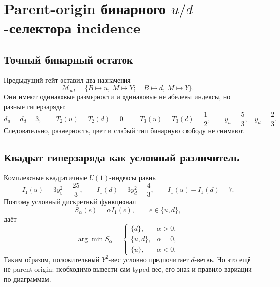\chapter{Parent-origin бинарного \texorpdfstring{$u/d$}{u/d}-селектора incidence}
\label{ch:v8-extra-mass-up-down-binary-selector-origin}

\section{Точный бинарный остаток}

Предыдущий гейт оставил два назначения
\begin{equation}
 \mathcal M_{ud}=\{B\mapsto u,\ M\mapsto Y;\quad
                    B\mapsto d,\ M\mapsto Y\}.
 \label{eq:v8-up-down-selector-binary-menu}
\end{equation}
Они имеют одинаковые размерности и одинаковые не абелевы индексы, но
разные гиперзаряды:
\begin{equation}
 d_u=d_d=3,\qquad T_2(u)=T_2(d)=0,\qquad
 T_3(u)=T_3(d)=\frac12,\qquad
 y_u=\frac53,\quad y_d=\frac23.
 \label{eq:v8-up-down-selector-representation-data}
\end{equation}
Следовательно, размерность, цвет и слабый тип бинарную свободу не снимают.

\section{Квадрат гиперзаряда как условный различитель}

Комплексные квадратичные $U(1)$-индексы равны
\begin{equation}
 I_1(u)=3y_u^2=\frac{25}{3},\qquad
 I_1(d)=3y_d^2=\frac{4}{3},\qquad
 I_1(u)-I_1(d)=7.
 \label{eq:v8-up-down-selector-u1-index-gap}
\end{equation}
Поэтому условный дискретный функционал
\begin{equation}
 S_\alpha(e)=\alpha I_1(e),\qquad e\in\{u,d\},
 \label{eq:v8-up-down-selector-conditional-score}
\end{equation}
даёт
\begin{equation}
 \arg\min S_\alpha=
 \begin{cases}
 \{d\},&\alpha>0,\\
 \{u,d\},&\alpha=0,\\
 \{u\},&\alpha<0.
 \end{cases}
 \label{eq:v8-up-down-selector-score-minimizers}
\end{equation}
Таким образом, положительный $Y^2$-вес условно предпочитает $d$-ветвь.
Но это ещё не parent-origin: необходимо вывести сам typed-вес, его знак и
правило вариации по диаграммам.

